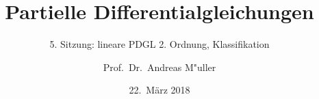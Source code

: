 %
%
%
\usepackage[utf8]{inputenc}
\usepackage[T1]{fontenc}
\usepackage{epic}
\usepackage{color}
\usepackage{array}
\usepackage{ifthen}
\usepackage{tikz}
\usepackage{german}
\usetikzlibrary{shapes.geometric,decorations.pathmorphing}
\beamertemplatenavigationsymbolsempty
\title[]{Partielle Differentialgleichungen}
\subtitle{5. Sitzung: lineare PDGL 2. Ordnung, Klassifikation}
\date[22.~März 2018]{22.~März 2018}
\author{Prof.~Dr.~Andreas M"uller}

